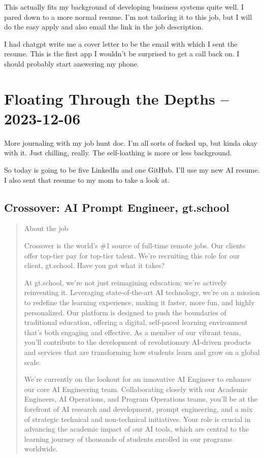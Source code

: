 \documentclass[
	letterpaper, %
	12pt, %
]{CSSullivanBusinessReport}
\begin{document}
This actually fits my background of developing business systems quite well. I pared down to a more normal resume. I'm not tailoring it to this job, but I will do the easy apply and also email the link in the job description. 

I had chatgpt write me a cover letter to be the email with which I sent the resume. This is the first app I wouldn't be surprised to get a call back on. I should probably start answering my phone. 


\section[6 Dec: GitHub]{Floating Through the Depths -- 2023-12-06} %

More journaling with my job hunt doc. I'm all sorts of fucked up, but kinda okay with it. Just chilling, really. The self-loathing is more or less background. 

So today is going to be five LinkedIn and one GitHub. I'll use my new AI resume. I also sent that resume to my mom to take a look at. 

\subsection[Crossover]{Crossover: AI Prompt Engineer, gt.school}

\begin{quote}
	About the job
	
	Crossover is the world's \#1 source of full-time remote jobs. Our clients offer top-tier pay for top-tier talent. We're recruiting this role for our client, gt.school. Have you got what it takes?

	At gt.school, we're not just reimagining education; we're actively reinventing it. Leveraging state-of-the-art AI technology, we're on a mission to redefine the learning experience, making it faster, more fun, and highly personalized. Our platform is designed to push the boundaries of traditional education, offering a digital, self-paced learning environment that's both engaging and effective. As a member of our vibrant team, you'll contribute to the development of revolutionary AI-driven products and services that are transforming how students learn and grow on a global scale.

	We're currently on the lookout for an innovative AI Engineer to enhance our core AI Engineering team. Collaborating closely with our Academic Engineers, AI Operations, and Program Operations teams, you'll be at the forefront of AI research and development, prompt engineering, and a mix of strategic technical and non-technical initiatives. Your role is crucial in advancing the academic impact of our AI tools, which are central to the learning journey of thousands of students enrolled in our programs worldwide.

\end{quote}
\end{document}
